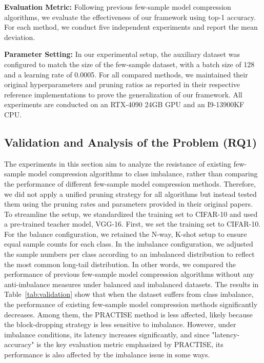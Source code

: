 \documentclass[twoside,11pt]{article}
\begin{document}
\noindent \textbf{Evaluation Metric:}
Following previous few-sample model compression algorithms, we evaluate the effectiveness of our framework using top-1 accuracy. For each method, we conduct five independent experiments and report the mean deviation.


\noindent \textbf{Parameter Setting:}
In our experimental setup, the auxiliary dataset was configured to match the size of the few-sample dataset, with a batch size of 128 and a learning rate of 0.0005. For all compared methods, we maintained their original hyperparameters and pruning ratios as reported in their respective reference implementations to prove the generalization of our framework. All experiments are conducted on an RTX-4090 24GB GPU and an I9-13900KF CPU.


\subsection{Validation and Analysis of the Problem (RQ1)}
The experiments in this section aim to analyze the resistance of existing few-sample model compression algorithms to class imbalance, rather than comparing the performance of different few-sample model compression methods. Therefore, we did not apply a unified pruning strategy for all algorithms but instead tested them using the pruning rates and parameters provided in their original papers. To streamline the setup, we standardized the training set to CIFAR-10 and used a pre-trained teacher model, VGG-16. First, we set the training set to CIFAR-10. For the balance configuration, we retained the N-way, K-shot setup to ensure equal sample counts for each class. In the imbalance configuration, we adjusted the sample numbers per class according to an imbalanced distribution to reflect the most common long-tail distribution. In other words, we compared the performance of previous few-sample model compression algorithms without any anti-imbalance measures under balanced and imbalanced datasets. The results in Table~\ref{tab:validation} show that when the dataset suffers from class imbalance, the performance of existing few-sample model compression methods significantly decreases. Among them, the PRACTISE method is less affected, likely because the block-dropping strategy is less sensitive to imbalance. However, under imbalance conditions, its latency increases significantly, and since "latency-accuracy" is the key evaluation metric emphasized by PRACTISE, its performance is also affected by the imbalance issue in some ways.
\end{document}
